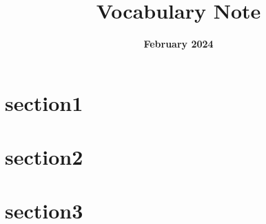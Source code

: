 \documentclass[a4paper,xelatex,ja=standard, enablejfam=true, jbase=8pt, nomag]{article}
\title{\Huge \bf Vocabulary Note}
\author{\huge \bf February 2024}
\date{}
\begin{document}
\maketitle

\newpage






\section*{section1}


\newpage






\section*{section2}


\newpage






\section*{section3}


\newpage










\printindex
\end{document}
